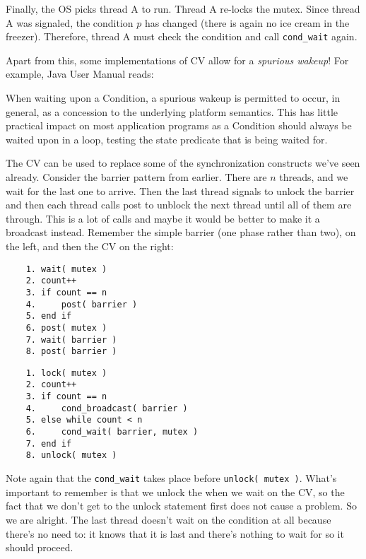 Finally, the OS picks thread A to run.
Thread A re-locks the mutex.
Since thread A was signaled, the condition $p$ has changed (there is again no ice cream in the freezer).
Therefore, thread A must check the condition and call \texttt{cond\_wait} again.

Apart from this, some implementations of CV allow for a \emph{spurious wakeup}!
For example, Java User Manual reads:
\begin{displayquote}
	When waiting upon a Condition, a spurious wakeup is permitted to occur, in general, as a concession to the underlying platform semantics.
	This has little practical impact on most application programs as a Condition should always be waited upon in a loop, testing the state predicate that is being waited for.
\end{displayquote}

The CV can be used to replace some of the synchronization constructs we've seen already. Consider the barrier pattern from earlier. There are $n$ threads, and we wait for the last one to arrive. Then the last thread signals to unlock the barrier and then each thread calls post to unblock the next thread until all of them are through. This is a lot of calls and maybe it would be better to make it a broadcast instead. Remember the simple barrier (one phase rather than two), on the left, and then the CV on the right:

\begin{multicols}{2}
	\begin{verbatim}
	1. wait( mutex )
	2. count++
	3. if count == n
	4.     post( barrier )
	5. end if
	6. post( mutex )
	7. wait( barrier )
	8. post( barrier )
  \end{verbatim}
	\columnbreak
	\begin{verbatim}
	1. lock( mutex )
	2. count++
	3. if count == n
	4.     cond_broadcast( barrier )
	5. else while count < n
	6.     cond_wait( barrier, mutex )
	7. end if
	8. unlock( mutex )
  \end{verbatim}
\end{multicols}

Note again that the \texttt{cond\_wait} takes place before \texttt{unlock( mutex )}. What's important to remember is that we unlock the  when we wait on the CV, so the fact that we don't get to the unlock statement first does not cause a problem. So we are alright. The last thread doesn't wait on the condition at all because there's no need to: it knows that it is last and there's nothing to wait for so it should proceed.

